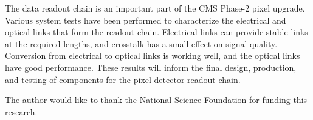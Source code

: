 \documentclass[a4paper,11pt]{article}
\begin{document}
The data readout chain is an important part of the CMS Phase-2 pixel upgrade.
Various system tests have been performed to characterize the electrical and optical links that form the readout chain.
Electrical links can provide stable links at the required lengths, and crosstalk has a small effect on signal quality.
Conversion from electrical to optical links is working well, and the optical links have good performance.
These results will inform the final design, production, and testing of components for the pixel detector readout chain.


\acknowledgments

The author would like to thank the National Science Foundation for funding this research.

\end{document}
